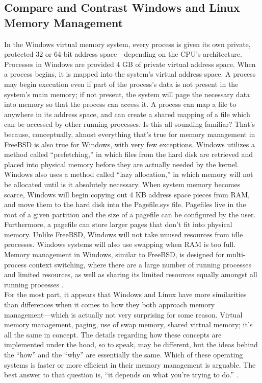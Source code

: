 \documentclass[onecolumn, draftclsnofoot,10pt, compsoc]{IEEEtran}
\begin{document}
\subsection{Compare and Contrast Windows and Linux Memory Management}
\noindent In the Windows virtual memory system, every process is given its own private, protected 32 or 64-bit address space–--depending on the CPU’s architecture. Processes in Windows are provided 4 GB of private virtual address space. When a process begins, it is mapped into the system’s virtual address space. A process may begin execution even if part of the process’s data is not present in the system’s main memory; if not present, the system will page the necessary data into memory so that the process can access it. A process can map a file to anywhere in its address space, and can create a shared mapping of a file which can be accessed by other running processes. Is this all sounding familiar? That’s because, conceptually, almost everything that’s true for memory management in FreeBSD is also true for Windows, with very few exceptions. Windows utilizes a method called “prefetching,” in which files from the hard disk are retrieved and placed into physical memory before they are actually needed by the kernel. Windows also uses a method called “lazy allocation,” in which memory will not be allocated until is it absolutely necessary. When system memory becomes scarce, Windows will begin copying out 4 KB address space pieces from RAM, and move them to the hard disk into the Pagefile.sys file. Pagefiles live in the root of a given partition and the size of a pagefile can be configured by the user. Furthermore, a pagefile can store larger pages that don’t fit into physical memory. Unlike FreeBSD, Windows will not take unused resources from idle processes. Windows systems will also use swapping when RAM is too full. Memory management in Windows, similar to FreeBSD, is designed for multi-process context switching, where there are a large number of running processes and limited resources, as well as sharing its limited resources equally amongst all running processes \cite{MSWindows1Mem} \cite{MSWindows2Mem}.\\

For the most part, it appears that Windows and Linux have more similarities than differences when it comes to how they both approach memory management–--which is actually not very surprising for some reason. Virtual memory management, paging, use of swap memory, shared virtual memory; it’s all the same in concept. The details regarding how these concepts are implemented under the hood, so to speak, may be different, but the ideas behind the “how” and the “why” are essentially the same. Which of these operating systems is faster or more efficient in their memory management is arguable. The best answer to that question is, “it depends on what you’re trying to do.” \cite{Linux1Mem} \cite{Linux}.\\
\end{document}
